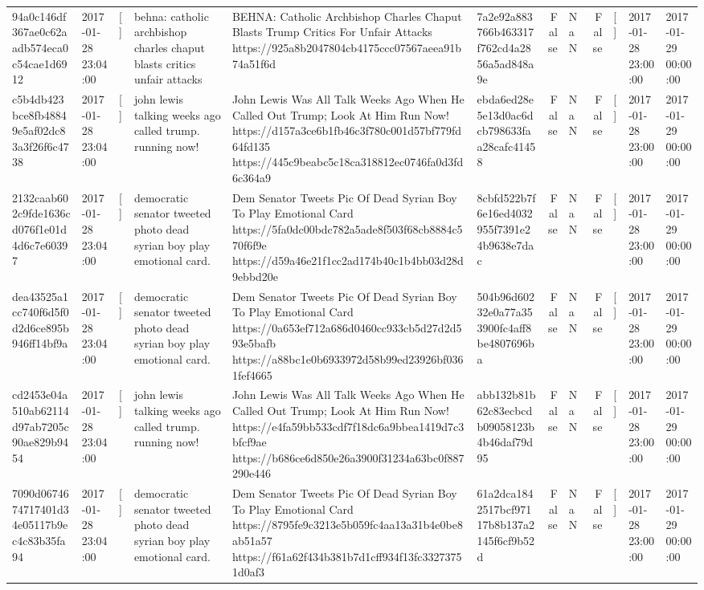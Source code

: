 \begin{tabular}{llllllrlrlll}
94a0c146df367ae0c62aadb574eca0c54cae1d6912 & 2017-01-28 23:04:00 & [] & behna: catholic archbishop charles chaput blasts critics unfair attacks & BEHNA: Catholic Archbishop Charles Chaput Blasts Trump Critics For Unfair Attacks https://925a8b2047804cb4175ccc07567aeea91b74a51f6d & 7a2e92a883766b463317f762cd4a2856a5ad848a9e & False & NaN & False & [] & 2017-01-28 23:00:00 & 2017-01-29 00:00:00 \\
c5b4db423bce8fb48849e5af02dc83a3f26f6c4738 & 2017-01-28 23:04:00 & [] & john lewis talking weeks ago called trump. running now! & John Lewis Was All Talk Weeks Ago When He Called Out Trump; Look At Him Run Now! https://d157a3ce6b1fb46c3f780c001d57bf779fd64fd135 https://445c9beabc5c18ca318812ec0746fa0d3fd6c364a9 & ebda6ed28e5e13d0ac6dcb798633faa28cafc41458 & False & NaN & False & [] & 2017-01-28 23:00:00 & 2017-01-29 00:00:00 \\
2132caab602c9fde1636cd076f1e01d4d6c7e60397 & 2017-01-28 23:04:00 & [] & democratic senator tweeted photo dead syrian boy play emotional card. & Dem Senator Tweets Pic Of Dead Syrian Boy To Play Emotional Card https://5fa0dc00bdc782a5ade8f503f68cb8884c570f6f9e https://d59a46e21f1cc2ad174b40c1b4bb03d28d9ebbd20e & 8cbfd522b7f6e16ed4032955f7391e24b9638e7dac & False & NaN & False & [] & 2017-01-28 23:00:00 & 2017-01-29 00:00:00 \\
dea43525a1cc740f6d5f0d2d6ce895b946ff14bf9a & 2017-01-28 23:04:00 & [] & democratic senator tweeted photo dead syrian boy play emotional card. & Dem Senator Tweets Pic Of Dead Syrian Boy To Play Emotional Card https://0a653ef712a686d0460cc933cb5d27d2d593e5bafb https://a88bc1e0b6933972d58b99ed23926bf0361fef4665 & 504b96d60232e0a77a353900fc4aff8be4807696ba & False & NaN & False & [] & 2017-01-28 23:00:00 & 2017-01-29 00:00:00 \\
cd2453e04a510ab62114d97ab7205c90ae829b9454 & 2017-01-28 23:04:00 & [] & john lewis talking weeks ago called trump. running now! & John Lewis Was All Talk Weeks Ago When He Called Out Trump; Look At Him Run Now! https://e4fa59bb533cdf7f18dc6a9bbea1419d7c3bfcf9ae https://b686ce6d850e26a3900f31234a63bc0f887290e446 & abb132b81b62c83ecbcdb09058123b4b46daf79d95 & False & NaN & False & [] & 2017-01-28 23:00:00 & 2017-01-29 00:00:00 \\
7090d0674674717401d34e05117b9ec4c83b35fa94 & 2017-01-28 23:04:00 & [] & democratic senator tweeted photo dead syrian boy play emotional card. & Dem Senator Tweets Pic Of Dead Syrian Boy To Play Emotional Card https://8795fe9c3213e5b059fc4aa13a31b4e0be8ab51a57 https://f61a62f434b381b7d1cff934f13fc33273751d0af3 & 61a2dca1842517bcf97117b8b137a2145f6cf9b52d & False & NaN & False & [] & 2017-01-28 23:00:00 & 2017-01-29 00:00:00 \\

\end{tabular}
